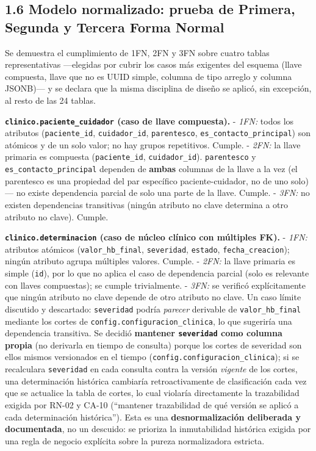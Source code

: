 \documentclass[11pt,a4paper]{article}
\begin{document}
\subsection{1.6 Modelo normalizado: prueba de Primera, Segunda y Tercera Forma Normal}\label{modelo-normalizado-prueba-de-primera-segunda-y-tercera-forma-normal}

Se demuestra el cumplimiento de 1FN, 2FN y 3FN sobre cuatro tablas representativas ---elegidas por cubrir los casos más exigentes del esquema (llave compuesta, llave que no es UUID simple, columna de tipo arreglo y columna JSONB)--- y se declara que la misma disciplina de diseño se aplicó, sin excepción, al resto de las 24 tablas.

\textbf{\texttt{clinico.paciente\_cuidador} (caso de llave compuesta).}
- \emph{1FN:} todos los atributos (\texttt{paciente\_id}, \texttt{cuidador\_id}, \texttt{parentesco}, \texttt{es\_contacto\_principal}) son atómicos y de un solo valor; no hay grupos repetitivos. Cumple.
- \emph{2FN:} la llave primaria es compuesta (\texttt{paciente\_id}, \texttt{cuidador\_id}). \texttt{parentesco} y \texttt{es\_contacto\_principal} dependen de \textbf{ambas} columnas de la llave a la vez (el parentesco es una propiedad del par específico paciente-cuidador, no de uno solo) --- no existe dependencia parcial de solo una parte de la llave. Cumple.
- \emph{3FN:} no existen dependencias transitivas (ningún atributo no clave determina a otro atributo no clave). Cumple.

\textbf{\texttt{clinico.determinacion} (caso de núcleo clínico con múltiples FK).}
- \emph{1FN:} atributos atómicos (\texttt{valor\_hb\_final}, \texttt{severidad}, \texttt{estado}, \texttt{fecha\_creacion}); ningún atributo agrupa múltiples valores. Cumple.
- \emph{2FN:} la llave primaria es simple (\texttt{id}), por lo que no aplica el caso de dependencia parcial (solo es relevante con llaves compuestas); se cumple trivialmente.
- \emph{3FN:} se verificó explícitamente que ningún atributo no clave depende de otro atributo no clave. Un caso límite discutido y descartado: \texttt{severidad} podría \emph{parecer} derivable de \texttt{valor\_hb\_final} mediante los cortes de \texttt{config.configuracion\_clinica}, lo que sugeriría una dependencia transitiva. Se decidió \textbf{mantener \texttt{severidad} como columna propia} (no derivarla en tiempo de consulta) porque los cortes de severidad son ellos mismos versionados en el tiempo (\texttt{config.configuracion\_clinica}); si se recalculara \texttt{severidad} en cada consulta contra la versión \emph{vigente} de los cortes, una determinación histórica cambiaría retroactivamente de clasificación cada vez que se actualice la tabla de cortes, lo cual violaría directamente la trazabilidad exigida por RN-02 y CA-10 (``mantener trazabilidad de qué versión se aplicó a cada determinación histórica''). Esta es una \textbf{desnormalización deliberada y documentada}, no un descuido: se prioriza la inmutabilidad histórica exigida por una regla de negocio explícita sobre la pureza normalizadora estricta.
\end{document}
